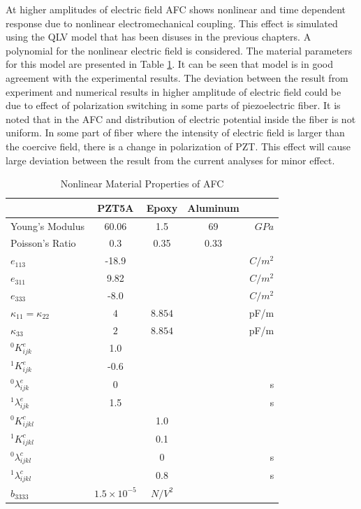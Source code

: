 At higher amplitudes of electric field AFC shows nonlinear and time dependent response due to nonlinear electromechanical coupling. 
This effect is simulated using the QLV model that has been disuses in the previous chapters. 
A polynomial for the nonlinear electric field is considered. The material parameters for this model are presented in Table \ref{table:non_linear_materila_properties_afc}.
It can be seen that model is in good agreement with the experimental results.
The deviation between the result from experiment and numerical results in higher amplitude of electric field could be due to effect of polarization switching in some parts of piezoelectric fiber.
It is noted that in the AFC and distribution of electric potential inside the fiber is not uniform.
In some part of fiber where the intensity of electric field is larger than the coercive field, there is a change in polarization of PZT.
This effect will cause large deviation between the result from the current analyses for minor effect.


\begin{table}
\caption{Nonlinear Material Properties of AFC}
\centering
\begin{tabular}{|l|c|c|c|r|}
\hline
               & PZT5A & Epoxy & Aluminum & \\ \hline 
Young's Modulus&60.06 & 1.5     & 69       &$GPa$    \\ \hline
Poisson's Ratio&$0.3$ & 0.35    & 0.33 &\\ \hline 
$e_{113}$      &-18.9 &         &      &$C/m^2$\\ \hline
$e_{311}$      &9.82&         &      &$C/m^2$\\ \hline
$e_{333}$      &-8.0  &         &      &$C/m^2$\\ \hline
$\kappa_{11}=\kappa_{22}$ &  $ 4  $ & $8.854  $ & &  pF/m \\ \hline
$\kappa_{33}$ & $2  $              & $8.854  $ & &  pF/m \\ \hline
${}^{0}K_{ijk}^{e}$&1.0& & &  \\ \hline
${}^{1}K_{ijk}^{e}$&-0.6& & & \\ \hline
${}^{0}\lambda_{ijk}^{e}$&0& & & s \\ \hline
${}^{1}\lambda_{ijk}^{e}$&1.5& & & s \\ \hline 
${}^{0}K_{ijkl}^{c}$& &1.0 & &  \\ \hline
${}^{1}K_{ijkl}^{c}$& &0.1 & & \\ \hline
${}^{0}\lambda_{ijkl}^{c}$& &0&  & s\\ \hline
${}^{1}\lambda_{ijkl}^{c}$& &0.8 & & s \\ \hline 
$\widehat{b}_{3333}$ & $1.5 \times 10^{-5}$ &  $ N/V^2 $\\ \hline
\end{tabular}
\label{table:non_linear_materila_properties_afc} 
\end{table} 
 
